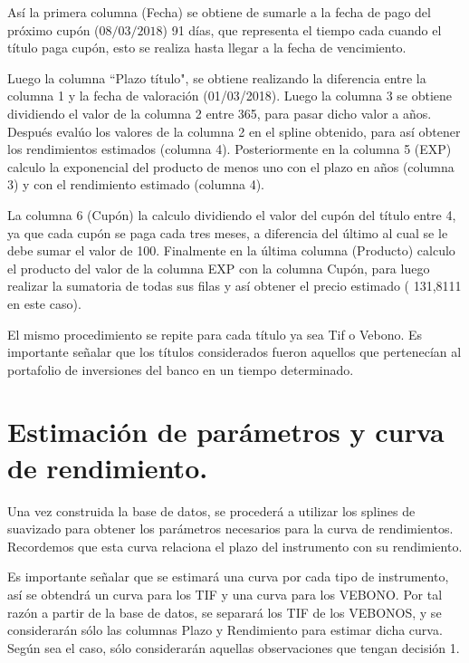 \hspace{0.4cm}As\'i la primera columna (Fecha) se obtiene de sumarle a la fecha de pago del pr\'oximo cup\'on ($08/03/2018$) 91 d\'ias, que representa el tiempo cada cuando el t\'itulo paga cup\'on, esto se realiza  hasta llegar a la fecha de vencimiento.

\hspace{0.4cm} Luego la columna ``Plazo t\'itulo", se obtiene realizando la diferencia entre la columna 1 y la fecha de valoraci\'on (01/03/2018). Luego la columna 3 se obtiene dividiendo el valor de la columna 2 entre 365, para pasar dicho valor a a\~nos. Despu\'es eval\'uo los valores de la columna 2 en el spline obtenido, para as\'i obtener los rendimientos estimados (columna 4). Posteriormente en la columna 5 (EXP) calculo la exponencial del producto de menos uno con el plazo en a\~nos (columna 3) y con el rendimiento estimado (columna 4).


\hspace{0.4cm} La columna 6 (Cup\'on) la calculo dividiendo el valor del cup\'on del t\'itulo entre 4, ya que cada cup\'on se paga cada tres meses, a diferencia del \'ultimo al cual se le debe sumar el valor de 100. Finalmente en la \'ultima columna (Producto) calculo el producto del valor de la columna EXP con la columna Cup\'on, para luego realizar la sumatoria de todas sus filas y as\'i obtener el precio estimado ( 131,8111 en este caso).


\hspace{0.4cm}El mismo procedimiento se repite para cada t\'itulo ya sea Tif o Vebono. Es importante se\~nalar que los t\'itulos considerados fueron aquellos que pertenec\'ian al portafolio de inversiones del banco en un tiempo determinado.

\section{Estimaci\'on de par\'ametros y curva de rendimiento.}

\hspace{0.4cm} Una vez construida la base de datos, se proceder\'a a utilizar los splines de suavizado para obtener los par\'ametros necesarios para la curva de rendimientos. Recordemos que esta curva relaciona el plazo del instrumento con su rendimiento.


\hspace{0.4cm} Es importante se\~nalar que se estimar\'a una curva por cada tipo de instrumento, as\'i se obtendr\'a un curva para los TIF y una curva para los VEBONO. Por tal raz\'on a partir de la base de datos, se separar\'a los TIF de los VEBONOS, y se considerar\'an s\'olo las columnas Plazo y Rendimiento para estimar dicha curva. Seg\'un sea el caso, s\'olo considerar\'an aquellas observaciones que tengan decisi\'on 1.


